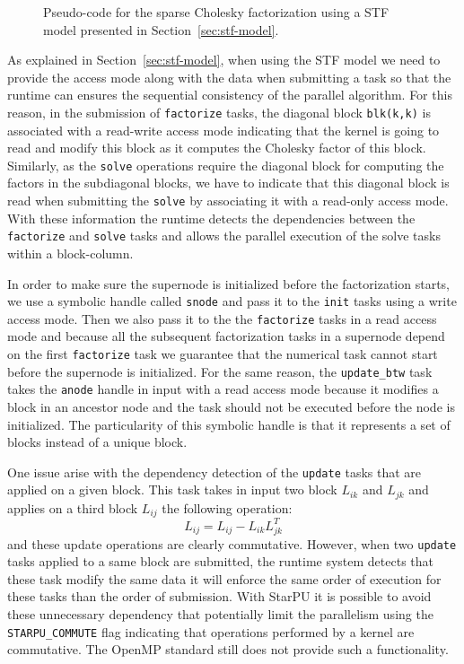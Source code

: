 \documentclass{article}
\begin{document}
\begin{figure}[!h]
  \centering 
  \caption{\label{fig:spllt-facto-pseudocode}Pseudo-code for the sparse
    Cholesky factorization using a STF model presented in
    Section~\ref{sec:stf-model}.}
\end{figure}

As explained in Section~\ref{sec:stf-model}, when using the STF model
we need to provide the access mode along with the data when submitting
a task so that the runtime can ensures the sequential consistency of
the parallel algorithm. For this reason, in the submission of
\texttt{factorize} tasks, the diagonal block \texttt{blk(k,k)} is
associated with a read-write access mode indicating that the kernel is
going to read and modify this block as it computes the Cholesky factor
of this block. Similarly, as the \texttt{solve} operations require the
diagonal block for computing the factors in the subdiagonal blocks, we
have to indicate that this diagonal block is read when submitting the
\texttt{solve} by associating it with a read-only access mode. With
these information the runtime detects the dependencies between the
\texttt{factorize} and \texttt{solve} tasks and allows the parallel
execution of the solve tasks within a block-column. 

In order to make sure the supernode is initialized before the
factorization starts, we use a symbolic handle called \texttt{snode}
and pass it to the \texttt{init} tasks using a write access mode. Then
we also pass it to the the \texttt{factorize} tasks in a read access
mode and because all the subsequent factorization tasks in a supernode
depend on the first \texttt{factorize} task we guarantee that the
numerical task cannot start before the supernode is initialized. For
the same reason, the \texttt{update\_btw} task takes the
\texttt{anode} handle in input with a read access mode because it
modifies a block in an ancestor node and the task should not be
executed before the node is initialized. The particularity of this
symbolic handle is that it represents a set of blocks instead of a
unique block.

One issue arise with the dependency detection of the \texttt{update}
tasks that are applied on a given block. This task takes in input two
block $L_{ik}$ and $L_{jk}$ and applies on a third block $L_{ij}$ the
following operation:
\begin{equation*}
  L_{ij} = L_{ij} - L_{ik}L_{jk}^{T}
\end{equation*}
and these update operations are clearly commutative. However, when two
\texttt{update} tasks applied to a same block are submitted, the
runtime system detects that these task modify the same data it will
enforce the same order of execution for these tasks than the order of
submission. With StarPU it is possible to avoid these unnecessary
dependency that potentially limit the parallelism using the
\texttt{STARPU\_COMMUTE} flag indicating that operations performed by
a kernel are commutative. The OpenMP standard still does not provide
such a functionality.
\end{document}
